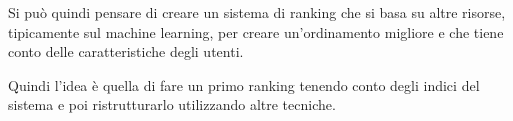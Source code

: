 Si può quindi pensare di creare un sistema di ranking che si basa su altre risorse, tipicamente sul machine learning, per creare un'ordinamento migliore e che tiene conto delle caratteristiche degli utenti.

Quindi l'idea è quella di fare un primo ranking tenendo conto degli indici del sistema e poi ristrutturarlo utilizzando altre tecniche.
